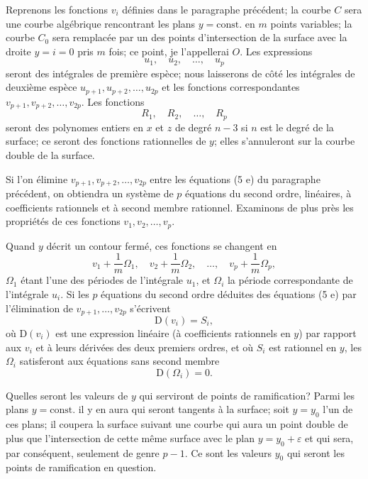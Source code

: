 \documentclass{article}
\begin{document}
Reprenons les fonctions $v_{i}$ définies dans le paragraphe précédent; la courbe $C$ sera une courbe algébrique rencontrant les plans $y = \text{const.}$ en $m$ points variables; la courbe $C_{0}$ sera remplacée par un des points d'intersection de la surface avec la droite $y = i = 0$ pris $m$ fois; ce point, je l'appellerai $O$. Les expressions
\[
u_{1}, \quad u_{2}, \quad \ldots, \quad u_{p}
\]
seront des intégrales de première espèce; nous laisserons de côté les intégrales de deuxième espèce $u_{p+1}, u_{p+2}, \ldots, u_{2p}$ et les fonctions correspondantes $v_{p+1}, v_{p+2}, \ldots, v_{2p}$. Les fonctions
\[
R_{1}, \quad R_{2}, \quad \ldots, \quad R_{p}
\]
seront des polynomes entiers en $x$ et $z$ de degré $n - 3$ si $n$ est le degré de la surface; ce seront des fonctions rationnelles de $y$; elles s'annuleront sur la courbe double de la surface.

Si l'on élimine $v_{p+1}, v_{p+2}, \ldots, v_{2p}$ entre les équations (5 e) du paragraphe précédent, on obtiendra un système de $p$ équations du second ordre, linéaires, à coefficients rationnels et à second membre rationnel. Examinons de plus près les propriétés de ces fonctions $v_{1}, v_{2}, \ldots, v_{p}$.

Quand $y$ décrit un contour fermé, ces fonctions se changent en
\[
v_{1} + \frac{1}{m} \Omega_{1}, \quad v_{2} + \frac{1}{m} \Omega_{2}, \quad \ldots, \quad v_{p} + \frac{1}{m} \Omega_{p},
\]
$\Omega_{1}$ étant l'une des périodes de l'intégrale $u_{1}$, et $\Omega_{i}$ la période correspondante de l'intégrale $u_{i}$. Si les $p$ équations du second ordre déduites des équations (5 e) par l'élimination de $v_{p+1}, \ldots, v_{2p}$ s'écrivent
\[
\mathrm{D}(v_{i}) = S_{i}, \tag{1}
\]
où $\mathrm{D}(v_{i})$ est une expression linéaire (à coefficients rationnels en $y$) par rapport aux $v_{i}$ et à leurs dérivées des deux premiers ordres, et où $S_{i}$ est rationnel en $y$, les $\Omega_{i}$ satisferont aux équations sans second membre
\[
\mathrm{D}(\Omega_{i}) = 0. \tag{2}
\]

Quelles seront les valeurs de $y$ qui serviront de points de ramification? Parmi les plans $y = \text{const.}$ il y en aura qui seront tangents à la surface; soit $y = y_{0}$ l'un de ces plans; il coupera la surface suivant une courbe qui aura un point double de plus que l'intersection de cette même surface avec le plan $y = y_{0} + \varepsilon$ et qui sera, par conséquent, seulement de genre $p - 1$. Ce sont les valeurs $y_{0}$ qui seront les points de ramification en question.
\end{document}
